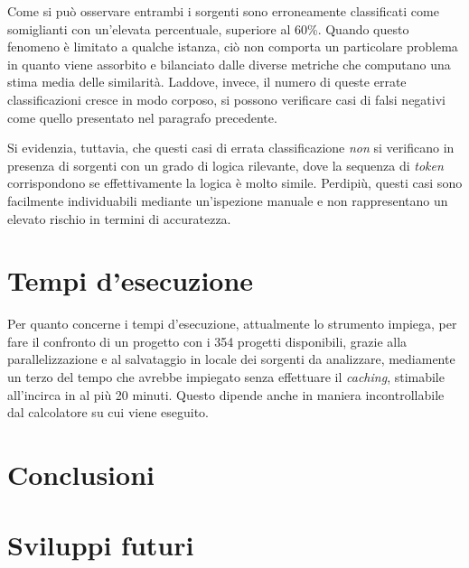 Come si può osservare entrambi i sorgenti sono erroneamente classificati come somiglianti con un'elevata percentuale, superiore al 60\%.
%
Quando questo fenomeno è limitato a qualche istanza, ciò non comporta un particolare problema in quanto viene assorbito e bilanciato dalle diverse metriche che computano una stima media delle similarità.
%
Laddove, invece, il numero di queste errate classificazioni cresce in modo corposo,  si possono verificare casi di falsi negativi come quello presentato nel paragrafo precedente.

Si evidenzia, tuttavia, che questi casi di errata classificazione \textit{non} si verificano in presenza di sorgenti con un grado di logica rilevante, dove la sequenza di \textit{token} corrispondono se effettivamente la logica è molto simile.
%
Perdipiù, questi casi sono facilmente individuabili mediante un'ispezione manuale e non rappresentano un elevato rischio in termini di accuratezza.

\section{Tempi d'esecuzione}
Per quanto concerne i tempi d'esecuzione, attualmente lo strumento impiega, per fare il confronto di un progetto con i 354 progetti disponibili, grazie alla parallelizzazione e al salvataggio in locale dei sorgenti da analizzare, mediamente un terzo del tempo che avrebbe impiegato senza effettuare il \textit{caching}, stimabile all'incirca in al più 20 minuti.
%
Questo dipende anche in maniera incontrollabile dal calcolatore su cui viene eseguito.

\section{Conclusioni}

\section{Sviluppi futuri}
